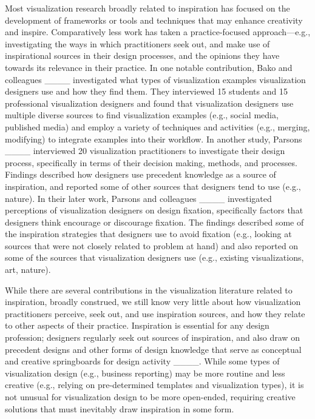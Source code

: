 Most visualization research broadly related to inspiration has focused on the development of frameworks or tools and techniques that may enhance creativity and inspire. Comparatively less work has taken a practice-focused approach---e.g., investigating the ways in which practitioners seek out, and make use of inspirational sources in their design processes, and the opinions they have towards its relevance in their practice. In one notable contribution, Bako and colleagues ____ investigated what types of visualization examples visualization designers use and how they find them. They interviewed 15 students and 15 professional visualization designers and found that visualization designers use multiple diverse sources to find visualization examples (e.g., social media, published media) and employ a variety of techniques and activities (e.g., merging, modifying) to integrate examples into their workflow. In another study, Parsons ____ interviewed 20 visualization practitioners to investigate their design process, specifically in terms of their decision making, methods, and processes. Findings described how designers use precedent knowledge as a source of inspiration, and reported some of other sources that designers tend to use (e.g., nature). In their later work, Parsons and colleagues ____ investigated perceptions of visualization designers on design fixation, specifically factors that designers think encourage or discourage fixation. The findings described some of the inspiration strategies that designers use to avoid fixation (e.g., looking at sources that were not closely related to problem at hand) and also reported on some of the sources that visualization designers use (e.g., existing visualizations, art, nature). 

While there are several contributions in the visualization literature related to inspiration, broadly construed, we still know very little about how visualization practitioners perceive, seek out, and use inspiration sources, and how they relate to other aspects of their practice. Inspiration is essential for any design profession; designers regularly seek out sources of inspiration, and also draw on precedent designs and other forms of design knowledge that serve as conceptual and creative springboards for design activity ____. While some types of visualization design (e.g., business reporting) may be more routine and less creative (e.g., relying on pre-determined templates and visualization types), it is not unusual for visualization design to be more open-ended, requiring creative solutions that must inevitably draw inspiration in some form.